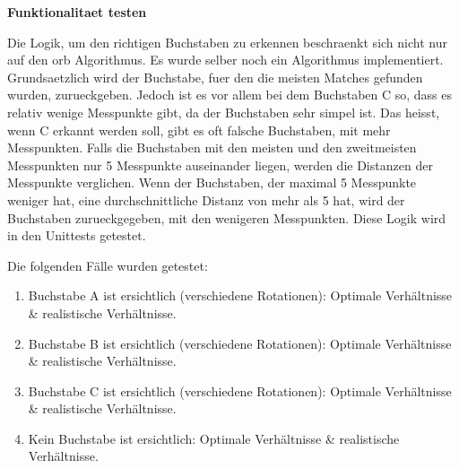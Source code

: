 \textbf{Funktionalitaet testen}

Die Logik, um den richtigen Buchstaben zu erkennen beschraenkt sich nicht nur auf den \acrshort{orb} Algorithmus. Es wurde selber noch ein Algorithmus implementiert. Grundsaetzlich wird der Buchstabe, fuer den die meisten Matches gefunden wurden, zurueckgeben. Jedoch ist es vor allem bei dem Buchstaben C so, dass es relativ wenige Messpunkte gibt, da der Buchstaben sehr simpel ist. Das heisst, wenn C erkannt werden soll, gibt es oft falsche Buchstaben, mit mehr Messpunkten. Falls die Buchstaben mit den meisten und den zweitmeisten Messpunkten nur 5 Messpunkte auseinander liegen, werden die Distanzen der Messpunkte verglichen. Wenn der Buchstaben, der maximal 5 Messpunkte weniger hat, eine durchschnittliche Distanz von mehr als 5 hat, wird der Buchstaben zurueckgegeben, mit den wenigeren Messpunkten. Diese Logik wird in den Unittests getestet.

Die folgenden Fälle wurden getestet:

\begin{enumerate}
    \item Buchstabe A ist ersichtlich (verschiedene Rotationen): Optimale Verhältnisse \& realistische Verhältnisse.
    \item Buchstabe B ist ersichtlich (verschiedene Rotationen): Optimale Verhältnisse \& realistische Verhältnisse.
    \item Buchstabe C ist ersichtlich (verschiedene Rotationen): Optimale Verhältnisse \& realistische Verhältnisse.
    \item Kein Buchstabe ist ersichtlich: Optimale Verhältnisse \& realistische Verhältnisse.
\end{enumerate}

